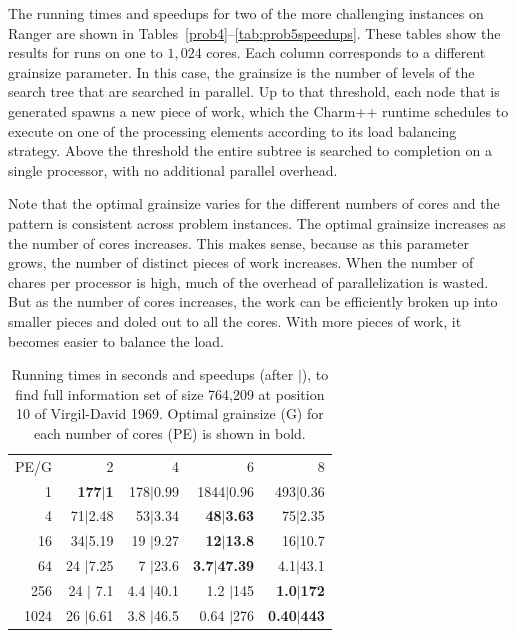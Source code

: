 \documentclass[times, 10pt,twocolumn]{article}
\begin{document}
The running times and speedups for two of the more challenging instances on
Ranger are shown in Tables~\ref{prob4}--\ref{tab:prob5speedups}.   These tables
show the results for runs on one to $1,024$ cores.  Each column corresponds to
a different grainsize parameter.  In this case, the grainsize is the number of
levels of the search tree that are searched in parallel.  Up to that threshold,
each node that is generated spawns a new piece of work, which the {\sc Charm++}
runtime schedules to execute on one of the processing elements according to its
load balancing strategy.  Above the threshold the entire subtree is searched to
completion on a single processor, with no additional parallel overhead. 

Note that the optimal grainsize varies for the different numbers of cores and
the pattern is consistent across problem instances.  The optimal
grainsize increases as the number of cores increases.  This makes sense,
because as this parameter grows, the number of distinct pieces of work
increases.  When the number of chares per processor is high, much of
the overhead of parallelization is wasted.  But as the number of cores
increases, the work can be efficiently broken up into smaller pieces and doled
out to all the cores.  With more pieces of work, it becomes easier to balance
the load.

\begin{table}[tphb]
\centering
\begin{tabular}{rrrrr}
PE/G & 2 & 4 & 6 & 8 \\
1 & {\bf 177$|$1} & 178$|$0.99 & 1844$|$0.96 & 493$|$0.36 \\
4 & 71$|$2.48 & 53$|$3.34 & {\bf 48$|$3.63} & 75$|$2.35 \\
16 & 34$|$5.19 & 19 $|$9.27& {\bf 12$|$13.8} & 16$|$10.7 \\
64 & 24 $|$7.25 & 7 $|$23.6& {\bf 3.7$|$47.39} & 4.1$|$43.1 \\
256 & 24 $|$ 7.1& 4.4 $|$40.1 & 1.2 $|$145& {\bf 1.0$|$172} \\
1024 & 26 $|$6.61 & 3.8 $|$46.5& 0.64 $|$276& {\bf 0.40$|$443}
\end{tabular}

\caption{Running times in seconds and speedups (after $|$), to find full
information set of size 764,209 at position 10 of Virgil-David 1969. Optimal
grainsize (G) for each number of cores (PE) is shown in bold.}

\vspace{-0.2in}
\label{tab:prob4}
\end{table}
\end{document}
